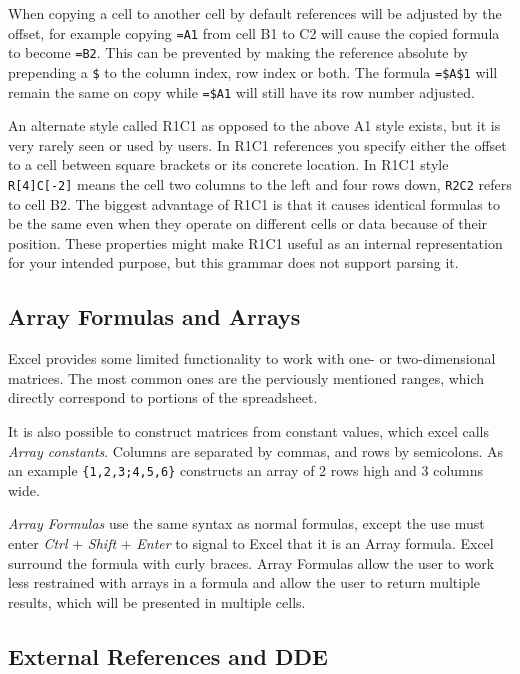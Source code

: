 \documentclass[conference]{IEEEtran}
\begin{document}
When copying a cell to another cell by default references will be adjusted by the offset, for example copying \texttt{=A1} from cell B1 to C2 will cause the copied formula to become \texttt{=B2}.
This can be prevented by making the reference absolute by prepending a \texttt{\$} to the column index, row index or both.
The formula \texttt{=\$A\$1} will remain the same on copy while \texttt{=\$A1} will still have its row number adjusted.

An alternate style called R1C1 as opposed to the above A1 style exists, but it is very rarely seen or used by users.
In R1C1 references you specify either the offset to a cell between square brackets or its concrete location.
In R1C1 style \texttt{R[4]C[-2]} means the cell two columns to the left and four rows down, \texttt{R2C2} refers to cell B2.
The biggest advantage of R1C1 is that it causes identical formulas to be the same even when they operate on different cells or data because of their position.
These properties might make R1C1 useful as an internal representation for your intended purpose, but this grammar does not support parsing it.

\subsection{Array Formulas and Arrays}

Excel provides some limited functionality to work with one- or two-dimensional matrices. The most common ones are the perviously mentioned ranges, which directly correspond to portions of the spreadsheet.

It is also possible to construct matrices from constant values, which excel calls \emph{Array constants}. Columns are separated by commas, and rows by semicolons. As an example \texttt{\{1,2,3;4,5,6\}} constructs an array of 2 rows high and 3 columns wide.

\emph{Array Formulas} use the same syntax as normal formulas, except the use must enter \emph{Ctrl} + \emph{Shift} + \emph{Enter} to signal to Excel that it is an Array formula. Excel surround the formula with curly braces. Array Formulas allow the user to work less restrained with arrays in a formula and allow the user to return multiple results, which will be presented in multiple cells.

\subsection{External References and DDE}
\end{document}
